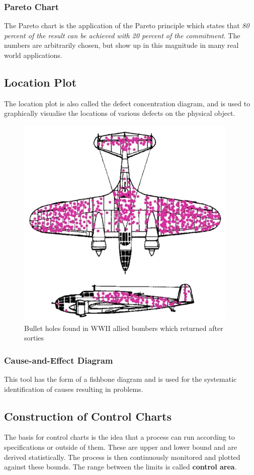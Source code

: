 \documentclass[11pt]{article}
\theoremstyle{definition}
\begin{document}
\subsubsection{Pareto Chart}
The Pareto chart is the application of the Pareto principle which states that \emph{80 percent of the result can be achieved with 20 percent of the commitment}. The numbers are arbitrarily chosen, but show up in this magnitude in many real world applications.

\subsection{Location Plot}
The location plot is also called the defect concentration diagram, and is used to graphically visualise the locations of various defects on the physical object.

\begin{figure}[H]
	\centering
	\includegraphics[width=0.5\linewidth]{img/bullet_holes_wwii}
	\caption{Bullet holes found in WWII allied bombers which returned after sorties}
	\label{fig:bulletholeswwii}
\end{figure}

\subsubsection{Cause-and-Effect Diagram}
This tool has the form of a fishbone diagram and is used for the systematic identification of causes resulting in problems.

\subsection{Construction of Control Charts}
The basis for control charts is the idea that a process can run according to specifications or outside of them. These are upper and lower bound and are derived statistically. The process is then continuously monitored and plotted against these bounds. The range between the limits is called \textbf{control area}.
\end{document}

